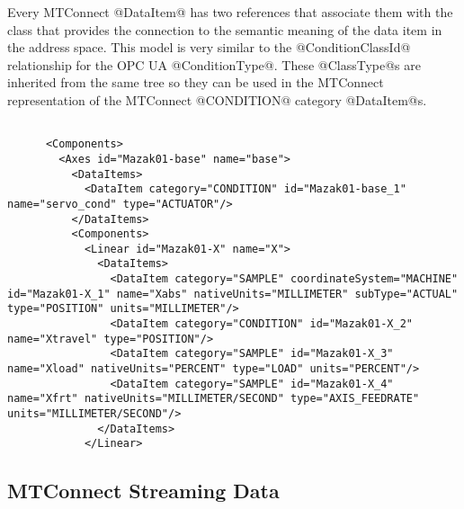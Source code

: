 Every MTConnect @DataItem@ has two references that associate them with the class that provides the connection to the semantic meaning of the data item in the address space. This model is very similar to the @ConditionClassId@ relationship for the OPC UA @ConditionType@. These @ClassType@s are inherited from the same tree so they can be used in the MTConnect representation of the MTConnect @CONDITION@ category @DataItem@s.



\begin{lstlisting}[firstnumber=last,%
    caption={Components},label={lst:device-component}]

      <Components>
        <Axes id="Mazak01-base" name="base">
          <DataItems>
            <DataItem category="CONDITION" id="Mazak01-base_1" name="servo_cond" type="ACTUATOR"/>
          </DataItems>
          <Components>
            <Linear id="Mazak01-X" name="X">
              <DataItems>
                <DataItem category="SAMPLE" coordinateSystem="MACHINE" id="Mazak01-X_1" name="Xabs" nativeUnits="MILLIMETER" subType="ACTUAL" type="POSITION" units="MILLIMETER"/>
                <DataItem category="CONDITION" id="Mazak01-X_2" name="Xtravel" type="POSITION"/>
                <DataItem category="SAMPLE" id="Mazak01-X_3" name="Xload" nativeUnits="PERCENT" type="LOAD" units="PERCENT"/>
                <DataItem category="SAMPLE" id="Mazak01-X_4" name="Xfrt" nativeUnits="MILLIMETER/SECOND" type="AXIS_FEEDRATE" units="MILLIMETER/SECOND"/>
              </DataItems>
            </Linear>
\end{lstlisting}

\FloatBarrier

\subsection{MTConnect Streaming Data}

\UndefineShortVerb{\@}